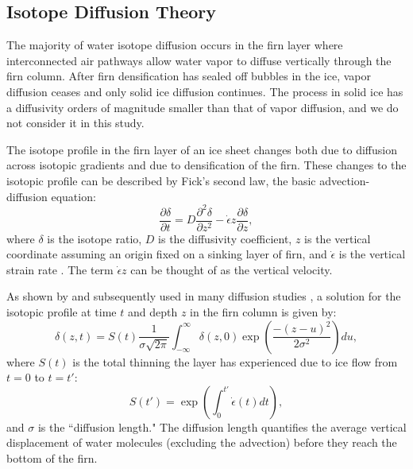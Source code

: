 \documentclass[draft, jgrga]{AGUTeX}
\begin{document}
\begin{article}

\section{Isotope Diffusion Theory}

The majority of water isotope diffusion occurs in the firn layer where interconnected air pathways allow water vapor to diffuse vertically through the firn column. After firn densification has sealed off bubbles in the ice, vapor diffusion ceases and only solid ice diffusion continues. The process in solid ice has a diffusivity orders of magnitude smaller than that of vapor diffusion, and we do not consider it in this study.

The isotope profile in the firn layer of an ice sheet changes both due to diffusion across isotopic gradients and due to densification of the firn. These changes to the isotopic profile can be described by Fick's second law, the basic advection-diffusion equation:
\begin{equation}
\frac{\partial \delta}{\partial t}
= D \frac{\partial ^2 \delta}{\partial z^2}
- \dot{\epsilon}
z \frac{\partial \delta}{\partial z},
\end{equation}
where $\delta$ is the isotope ratio, $D$ is the diffusivity coefficient, $z$ is the vertical coordinate assuming an origin fixed on a sinking layer of firn, and $\dot{\epsilon}$ is the vertical strain rate \citep{Johnsen1977, Whillans1985}. The term $\dot{\epsilon} z$ can be thought of as the vertical velocity.

As shown by \citet{Johnsen1977} and subsequently used in many diffusion studies \citep{Cuffey1998, Whillans1985, Johnsen2000, Simonsen2011, Gkinis2014, vanderWel2015, Jones2017a, Holme2017}, a solution for the isotopic profile at time $t$ and depth $z$ in the firn column is given by:
\begin{equation}
\label{eq:diff_sol}
\delta (z,t) = S(t) \frac{1}{\sigma \sqrt{2 \pi}}
\int^\infty_{-\infty} \delta (z,0) \exp \left(\frac{-(z-u)^2}{2 \sigma ^2} \right)du,
\end{equation}
where $S(t)$ is the total thinning the layer has experienced due to ice flow from $t=0$ to $t=t'$:
\begin{equation}
S(t') = \exp \left( \int^{t'}_{0} \dot{\epsilon}(t) dt \right),
\end{equation}
and $\sigma$ is the ``diffusion length." The diffusion length quantifies the average vertical displacement of water molecules (excluding the advection) before they reach the bottom of the firn.


\end{article}
\end{document}
